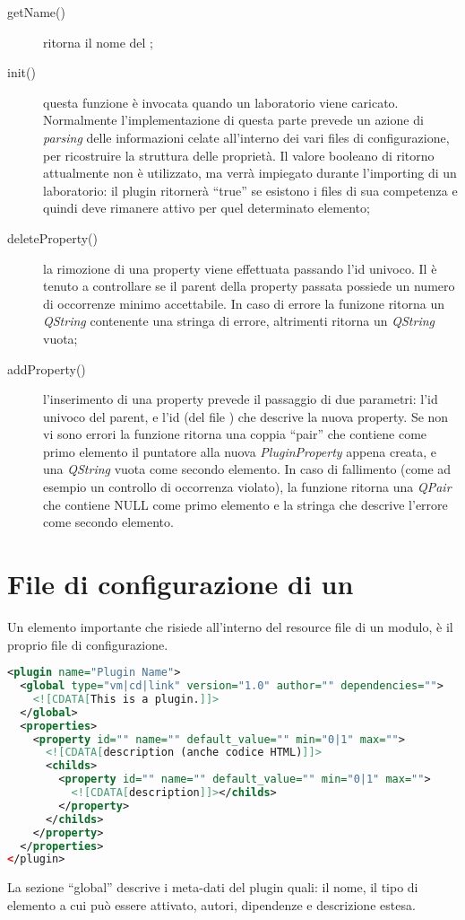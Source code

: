 \begin{description}
\item[getName()] ritorna il nome del \plugin{};

\item[init()] questa funzione è invocata quando un laboratorio viene caricato. Normalmente l'implementazione di questa parte prevede un azione di \emph{parsing} delle informazioni celate all'interno dei vari files di configurazione, per ricostruire la struttura delle proprietà. Il valore booleano di ritorno attualmente non è utilizzato, ma verrà impiegato durante l'importing di un laboratorio: il plugin ritornerà ``true'' se esistono i files di sua competenza e quindi deve rimanere attivo per quel determinato elemento;

\item[deleteProperty()] la rimozione di una property viene effettuata passando l'id univoco. Il \plugin{} è tenuto a controllare se il parent della property passata possiede un numero di occorrenze minimo accettabile. In caso di errore la funizone ritorna un \emph{QString} contenente una stringa di errore, altrimenti ritorna un \emph{QString} vuota;

\item[addProperty()] l'inserimento di una property prevede il passaggio di due parametri: l'id univoco del parent, e l'id (del file \xml{}) che descrive la nuova property. Se non vi sono errori la funzione ritorna una coppia ``pair'' che contiene come primo elemento il puntatore alla nuova \emph{PluginProperty} appena creata, e una \emph{QString} vuota come secondo elemento. In caso di fallimento (come ad esempio un controllo di occorrenza violato), la funzione ritorna una \emph{QPair} che contiene NULL come primo elemento e la stringa che descrive l'errore come secondo elemento.
\end{description}

\section*{File di configurazione di un \plugin{}}
Un elemento importante che risiede all'interno del resource file di un modulo, è il proprio file di configurazione.
\begin{lstlisting}[language=xml]
<plugin name="Plugin Name">
  <global type="vm|cd|link" version="1.0" author="" dependencies="">
    <![CDATA[This is a plugin.]]>
  </global>
  <properties>
    <property id="" name="" default_value="" min="0|1" max="">
      <![CDATA[description (anche codice HTML)]]>
      <childs>
        <property id="" name="" default_value="" min="0|1" max="">
          <![CDATA[description]]></childs>
        </property>
      </childs>
    </property> 
  </properties>
</plugin>
\end{lstlisting}
La sezione ``global'' descrive i meta-dati del plugin quali: il nome, il tipo di elemento a cui può essere attivato, autori, dipendenze e descrizione estesa.

